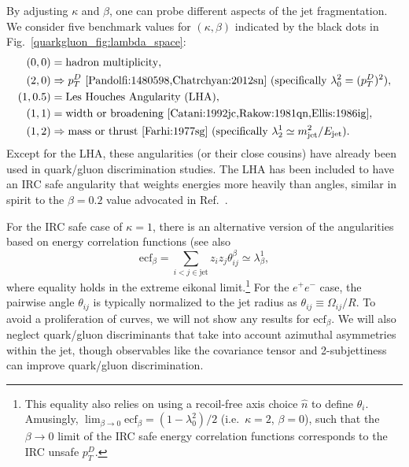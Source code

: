 \documentclass[11pt]{cernrep}
\begin{document}
By adjusting $\kappa$ and $\beta$, one can probe different aspects of the jet fragmentation.  We consider five benchmark values for $(\kappa, \beta)$ indicated by the black dots in Fig.~\ref{quarkgluon_fig:lambda_space}:
\begin{equation}
\label{quarkgluon_eq:benchmarkang}
\begin{aligned}
(0,0) &= \text{hadron multiplicity},\\
(2,0) &\Rightarrow p_T^D \text{  \cite{Pandolfi:1480598,Chatrchyan:2012sn} (specifically $\lambda^{2}_{0} = (p_T^D)^2$)},\\
(1,0.5) & = \text{Les Houches Angularity (LHA)},\\
(1,1) &= \text{width or broadening \cite{Catani:1992jc,Rakow:1981qn,Ellis:1986ig}},\\
(1,2) & \Rightarrow \text{mass or thrust \cite{Farhi:1977sg} (specifically $\lambda^{1}_{2} \simeq m_{\rm jet}^2 / E_{\rm jet}$)}.
\end{aligned}
\end{equation}
Except for the LHA, these angularities (or their close cousins) have already been used in quark/gluon discrimination studies.  The LHA has been included to have an IRC safe angularity that weights energies more heavily than angles, similar in spirit to the $\beta = 0.2$ value advocated in Ref.~\cite{Larkoski:2013eya}.

For the IRC safe case of $\kappa = 1$, there is an alternative version
of the angularities based on energy correlation functions \cite{Larkoski:2013eya} (see also \cite{Banfi:2004yd,Jankowiak:2011qa}
\begin{equation}
\text{ecf}_\beta = \sum_{i < j \in \text{jet}} z_i z_j \theta_{ij}^\beta \simeq \lambda^{1}_{\beta},
\end{equation}
where equality holds in the extreme eikonal limit.\footnote{This equality also relies on using a recoil-free axis choice $\hat{n}$ to define $\theta_i$.  Amusingly, $\lim_{\beta \to 0} \text{ecf}_\beta = (1 - \lambda^{2}_{0})/2$ (i.e.~$\kappa = 2$, $\beta = 0$), such that the $\beta \to 0$ limit of the IRC safe energy correlation functions corresponds to the IRC unsafe $p_T^D$.}  For the $e^+ e^-$ case, the pairwise angle $\theta_{ij}$ is typically normalized to the jet radius as $\theta_{ij} \equiv \Omega_{ij}/R$.   To avoid a proliferation of curves, we will not show any results for $\text{ecf}_\beta$.  We will also neglect quark/gluon discriminants that take into account azimuthal asymmetries within the jet, though observables like the covariance tensor \cite{Gallicchio:2012ez} and 2-subjettiness \cite{Thaler:2010tr,Thaler:2011gf} can improve quark/gluon discrimination.
\end{document}
